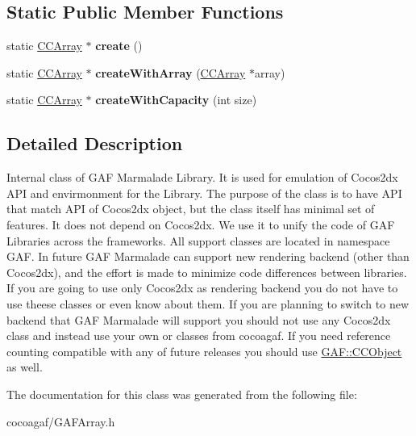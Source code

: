 \subsection*{Static Public Member Functions}
\begin{DoxyCompactItemize}
\item 
\hypertarget{class_g_a_f_1_1_c_c_array_a947a45d82f708788099f2e8dbcea2dd3}{static \hyperlink{class_g_a_f_1_1_c_c_array}{C\-C\-Array} $\ast$ {\bfseries create} ()}\label{class_g_a_f_1_1_c_c_array_a947a45d82f708788099f2e8dbcea2dd3}

\item 
\hypertarget{class_g_a_f_1_1_c_c_array_a247c90f7c332f7e49e950f297793d598}{static \hyperlink{class_g_a_f_1_1_c_c_array}{C\-C\-Array} $\ast$ {\bfseries create\-With\-Array} (\hyperlink{class_g_a_f_1_1_c_c_array}{C\-C\-Array} $\ast$array)}\label{class_g_a_f_1_1_c_c_array_a247c90f7c332f7e49e950f297793d598}

\item 
\hypertarget{class_g_a_f_1_1_c_c_array_a68779ee5b8c9e3e105b13016faf0298f}{static \hyperlink{class_g_a_f_1_1_c_c_array}{C\-C\-Array} $\ast$ {\bfseries create\-With\-Capacity} (int size)}\label{class_g_a_f_1_1_c_c_array_a68779ee5b8c9e3e105b13016faf0298f}

\end{DoxyCompactItemize}


\subsection{Detailed Description}
Internal class of G\-A\-F Marmalade Library. It is used for emulation of Cocos2dx A\-P\-I and envirmonment for the Library. The purpose of the class is to have A\-P\-I that match A\-P\-I of Cocos2dx object, but the class itself has minimal set of features. It does not depend on Cocos2dx. We use it to unify the code of G\-A\-F Libraries across the frameworks. All support classes are located in namespace G\-A\-F. In future G\-A\-F Marmalade can support new rendering backend (other than Cocos2dx), and the effort is made to minimize code differences between libraries. If you are going to use only Cocos2dx as rendering backend you do not have to use theese classes or even know about them. If you are planning to switch to new backend that G\-A\-F Marmalade will support you should not use any Cocos2dx class and instead use your own or classes from cocoagaf. If you need reference counting compatible with any of future releases you should use \hyperlink{class_g_a_f_1_1_c_c_object}{G\-A\-F\-::\-C\-C\-Object} as well. 

The documentation for this class was generated from the following file\-:\begin{DoxyCompactItemize}
\item 
cocoagaf/G\-A\-F\-Array.\-h\end{DoxyCompactItemize}
